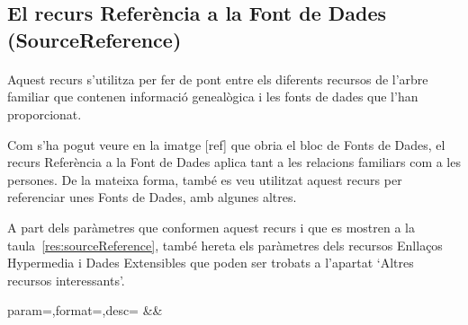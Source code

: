 \subsection{El recurs Referència a la Font de Dades (SourceReference)}

    \paragraph{}
    Aquest recurs s'utilitza per fer de pont entre els diferents recursos de l'arbre familiar que contenen informació genealògica i les fonts de dades que l'han proporcionat.

    Com s'ha pogut veure en la imatge [ref] que obria el bloc de Fonts de Dades, el recurs Referència a la Font de Dades aplica tant a les relacions familiars com a les persones. De la mateixa forma, també es veu utilitzat aquest recurs per referenciar unes Fonts de Dades, amb algunes altres.

    A part dels paràmetres que conformen aquest recurs i que es mostren a la taula~\ref{res:sourceReference}, també hereta els paràmetres dels recursos Enllaços Hypermedia i Dades Extensibles que poden ser trobats a l'apartat `Altres recursos interessants'.

    \begin{center}
             {param=\param,format=\format,desc=\desc}
             {\param&\format&\desc}
     \end{center}
